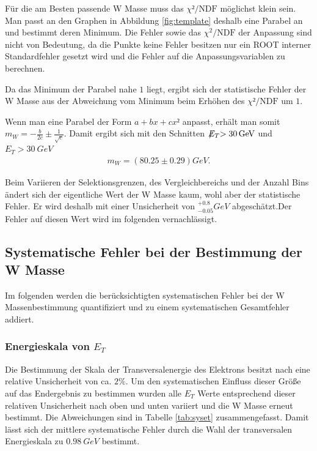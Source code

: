 \documentclass[a4paper,12pt]{article}
\newcommand{\met}{\ensuremath{\not\mathrel{E}}_T}
\begin{document}
Für die am Besten passende W Masse muss das $χ²/\text{NDF}$ möglichst klein sein. Man passt an den
Graphen in Abbildung \ref{fig:template} deshalb eine Parabel an und bestimmt deren Minimum. Die
Fehler sowie das $χ^2/\text{NDF}$ der Anpassung sind nicht von Bedeutung, da die Punkte keine
Fehler besitzen nur ein ROOT interner Standardfehler gesetzt wird und die Fehler auf die
Anpassungsvariablen zu berechnen.

Da das Minimum der Parabel nahe $1$ liegt, ergibt sich der statistische Fehler der W Masse aus der Abweichung vom Minimum beim Erhöhen des
$χ²/\text{NDF}$ um $1$.

Wenn man eine Parabel der Form $a + bx + cx²$ anpasst, erhält man somit $m_W = -\frac{b}{2c} ±
\frac{1}{\sqrt{c}}$.
Damit ergibt sich mit den Schnitten $\met > \SI{30}{GeV}$ und $E_{T} > \SI{30}{GeV}$
\begin{align*}
	m_W =  ( 80.25 ± 0.29  ) \si{GeV}.
\end{align*}

Beim Variieren der Selektionsgrenzen, des Vergleichbereichs und der Anzahl Bins ändert sich der
eigentliche Wert der W Masse kaum, wohl aber der statistische Fehler. Er wird deshalb mit einer
Unsicherheit von $^{+0.8}_{-0.05}\si{GeV}$ abgeschätzt.Der Fehler auf diesen Wert wird im folgenden
vernachlässigt.

\subsection{Systematische Fehler bei der Bestimmung der W Masse}
\label{sysunc}
Im folgenden werden die berücksichtigten systematischen Fehler bei der W Massenbestimmung quantifiziert und zu einem systematischen Gesamtfehler
addiert.
\subsubsection*{Energieskala von $E_{T}$}
Die Bestimmung der Skala der Transversalenergie des Elektrons besitzt nach \cite{Abachi:1996ey} eine relative Unsicherheit von ca. $2\%$. Um den systematischen Einfluss
dieser Größe auf das Endergebnis zu bestimmen wurden alle $E_{T}$ Werte entsprechend dieser relativen Unsicherheit nach oben und unten variiert und die
W Masse erneut bestimmt. Die Abweichungen sind in Tabelle \ref{tab:syset} zusammengefasst. Damit lässt sich der mittlere systematische Fehler durch die
Wahl der transversalen Energieskala zu $\SI{0.98}{GeV}$ bestimmt.
\end{document}
